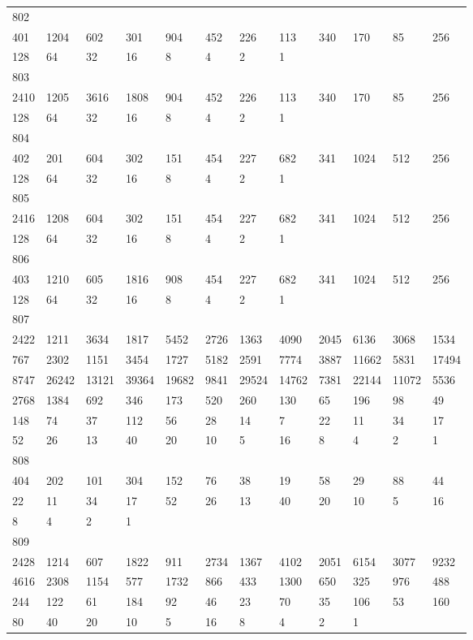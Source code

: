 \begin{longtable}{llllllllllll}
802&&&&&&&&&&&\\
401& 1204& 602& 301& 904& 452& 226& 113& 340& 170& 85& 256\\
128& 64& 32& 16& 8& 4& 2& 1& \\

803&&&&&&&&&&&\\
2410& 1205& 3616& 1808& 904& 452& 226& 113& 340& 170& 85& 256\\
128& 64& 32& 16& 8& 4& 2& 1& \\

804&&&&&&&&&&&\\
402& 201& 604& 302& 151& 454& 227& 682& 341& 1024& 512& 256\\
128& 64& 32& 16& 8& 4& 2& 1& \\

805&&&&&&&&&&&\\
2416& 1208& 604& 302& 151& 454& 227& 682& 341& 1024& 512& 256\\
128& 64& 32& 16& 8& 4& 2& 1& \\

806&&&&&&&&&&&\\
403& 1210& 605& 1816& 908& 454& 227& 682& 341& 1024& 512& 256\\
128& 64& 32& 16& 8& 4& 2& 1& \\

807&&&&&&&&&&&\\
2422& 1211& 3634& 1817& 5452& 2726& 1363& 4090& 2045& 6136& 3068& 1534\\
767& 2302& 1151& 3454& 1727& 5182& 2591& 7774& 3887& 11662& 5831& 17494\\
8747& 26242& 13121& 39364& 19682& 9841& 29524& 14762& 7381& 22144& 11072& 5536\\
2768& 1384& 692& 346& 173& 520& 260& 130& 65& 196& 98& 49\\
148& 74& 37& 112& 56& 28& 14& 7& 22& 11& 34& 17\\
52& 26& 13& 40& 20& 10& 5& 16& 8& 4& 2& 1\\

808&&&&&&&&&&&\\
404& 202& 101& 304& 152& 76& 38& 19& 58& 29& 88& 44\\
22& 11& 34& 17& 52& 26& 13& 40& 20& 10& 5& 16\\
8& 4& 2& 1& \\

809&&&&&&&&&&&\\
2428& 1214& 607& 1822& 911& 2734& 1367& 4102& 2051& 6154& 3077& 9232\\
4616& 2308& 1154& 577& 1732& 866& 433& 1300& 650& 325& 976& 488\\
244& 122& 61& 184& 92& 46& 23& 70& 35& 106& 53& 160\\
80& 40& 20& 10& 5& 16& 8& 4& 2& 1& \\


\end{longtable}
